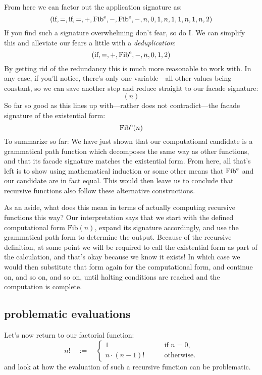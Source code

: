 \documentclass[twoside]{article}
\newcommand{\supst}[1]{\ensuremath{^{\mbox{\scriptsize #1}}}}
\begin{document}
\newpage

From here we can factor out the application signature as:
$$ (\mbox{if}, =, \mbox{if}, =, +, \mbox{Fib}\supst{e}, -, \mbox{Fib}\supst{e}, -, n, 0, 1, n, 1, 1, n, 1, n, 2) $$
If you find such a signature overwhelming don't fear, so do I.
We can simplify this and alleviate our fears a little with a \emph{deduplication}:
$$ (\mbox{if}, =, +, \mbox{Fib}\supst{e}, -, n, 0, 1, 2) $$
By getting rid of the redundancy this is much more reasonable to work with. In any case, if you'll notice, there's only
one variable---all other values being constant, so we can save another step and reduce straight to our facade signature:
$$ (n) $$
So far so good as this lines up with---rather does not contradict---the facade signature of the existential form:
$$ \mbox{Fib}\supst{e}(n) $$
To summarize so far: We have just shown that our computational candidate is a grammatical path function which decomposes
the same way as other functions, and that its facade signature matches the existential form. From here, all that's left
is to show using mathematical induction or some other means that $ \mbox{Fib}\supst{e} $ and our candidate are in
fact equal. This would then leave us to conclude that recursive functions also follow these alternative constructions.

As an aside, what does this mean in terms of actually computing recursive functions this way? Our interpretation says
that we start with the defined computational form $ \mbox{Fib}(n) $, expand its signature accordingly, and use the
grammatical path form to determine the output. Because of the recursive definition, at some point we will be required
to call the existential form as part of the calculation, and that's okay because we know it exists! In which case
we would then substitute that form again for the computational form, and continue on, and so on, and so on,
until halting conditions are reached and the computation is complete.

\subsection*{problematic evaluations}

Let's now return to our factorial function:
$$ n! \quad := \quad \left\{\begin{array}{ll}
1 & \qquad \mbox{if } n = 0,				\\
n \cdot (n-1)! & \qquad \mbox{otherwise.}
\end{array}\right. $$
and look at how the evaluation of such a recursive function can be problematic.
\end{document}
